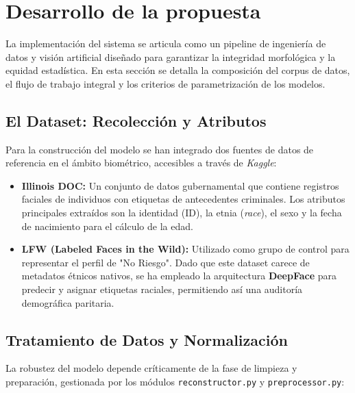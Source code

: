\section{Desarrollo de la propuesta}

La implementación del sistema se articula como un pipeline de ingeniería de datos y visión artificial diseñado para garantizar la integridad morfológica y la equidad estadística. En esta sección se detalla la composición del corpus de datos, el flujo de trabajo integral y los criterios de parametrización de los modelos.

\subsection{El Dataset: Recolección y Atributos}

Para la construcción del modelo se han integrado dos fuentes de datos de referencia en el ámbito biométrico, accesibles a través de \textit{Kaggle}:

\begin{itemize}
    \item \textbf{Illinois DOC:} Un conjunto de datos gubernamental que contiene registros faciales de individuos con etiquetas de antecedentes criminales. Los atributos principales extraídos son la identidad (ID), la etnia (\textit{race}), el sexo y la fecha de nacimiento para el cálculo de la edad.
    \item \textbf{LFW (Labeled Faces in the Wild):} Utilizado como grupo de control para representar el perfil de "No Riesgo". Dado que este dataset carece de metadatos étnicos nativos, se ha empleado la arquitectura \textbf{DeepFace} para predecir y asignar etiquetas raciales, permitiendo así una auditoría demográfica paritaria.
\end{itemize}

\subsection{Tratamiento de Datos y Normalización}

La robustez del modelo depende críticamente de la fase de limpieza y preparación, gestionada por los módulos \texttt{reconstructor.py} y \texttt{preprocessor.py}:

